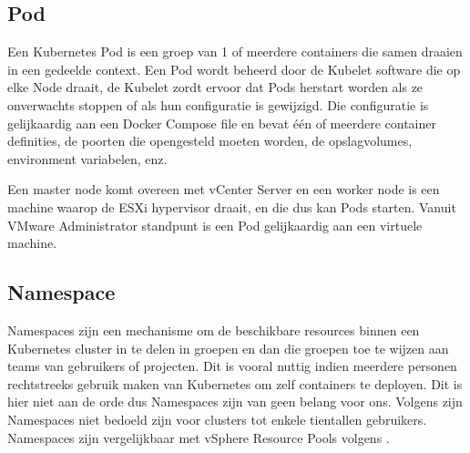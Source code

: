 \subsection{Pod}
Een Kubernetes Pod is een groep van 1 of meerdere containers die samen draaien in een gedeelde context. Een Pod wordt beheerd door de Kubelet software die op elke Node draait, de Kubelet zordt ervoor dat Pods herstart worden als ze onverwachts stoppen of als hun configuratie is gewijzigd. Die configuratie is gelijkaardig aan een Docker Compose file en bevat één of meerdere container definities, de poorten die opengesteld moeten worden, de opslagvolumes, environment variabelen, enz.
\autocite{NirShtein2023}

Een master node komt overeen met vCenter Server en een worker node is een machine waarop de ESXi hypervisor draait, en die dus kan Pods starten. Vanuit VMware Administrator standpunt is een Pod gelijkaardig aan een virtuele machine.\autocite{VMware2019}


\subsection{Namespace}
Namespaces zijn een mechanisme om de beschikbare resources binnen een Kubernetes cluster in te delen in groepen en dan die groepen toe te wijzen aan teams van gebruikers of projecten. Dit is vooral nuttig indien meerdere personen rechtstreeks gebruik maken van Kubernetes om zelf containers te deployen. Dit is hier niet aan de orde dus Namespaces zijn van geen belang voor ons. Volgens \textcite{Kubernetes2023c} zijn Namespaces niet bedoeld zijn voor clusters tot enkele tientallen gebruikers. Namespaces zijn vergelijkbaar met vSphere Resource Pools volgens \textcite{VMware2019}.
